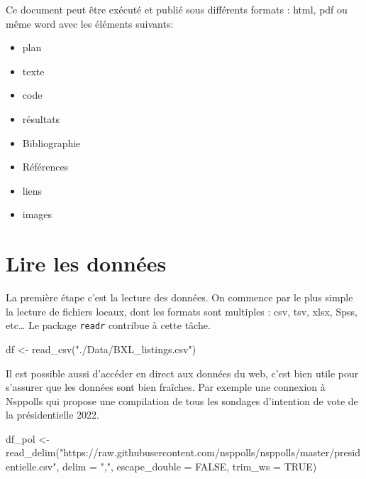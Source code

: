 \documentclass[
]{book}
\newenvironment{Shaded}{\begin{snugshade}}{\end{snugshade}}
\newcommand{\AttributeTok}[1]{\textcolor[rgb]{0.77,0.63,0.00}{#1}}
\newcommand{\ConstantTok}[1]{\textcolor[rgb]{0.00,0.00,0.00}{#1}}
\newcommand{\FunctionTok}[1]{\textcolor[rgb]{0.00,0.00,0.00}{#1}}
\newcommand{\NormalTok}[1]{#1}
\newcommand{\OtherTok}[1]{\textcolor[rgb]{0.56,0.35,0.01}{#1}}
\newcommand{\StringTok}[1]{\textcolor[rgb]{0.31,0.60,0.02}{#1}}
\providecommand{\tightlist}{%
  \setlength{\itemsep}{0pt}\setlength{\parskip}{0pt}}
\begin{document}
Ce document peut être exécuté et publié sous différents formats : html, pdf ou même word avec les éléments suivants:

\begin{itemize}
\tightlist
\item
  plan
\item
  texte
\item
  code
\item
  résultats
\item
  Bibliographie
\item
  Références
\item
  liens
\item
  images
\end{itemize}

\hypertarget{lire-les-donnuxe9es}{%
\section{Lire les données}\label{lire-les-donnuxe9es}}

La première étape c'est la lecture des données. On commence par le plus simple la lecture de fichiers locaux, dont les formats sont multiples : csv, tsv, xlsx, Spss, etc\ldots{} Le package \texttt{readr} contribue à cette tâche.

\begin{Shaded}
\begin{Highlighting}[]
\NormalTok{df }\OtherTok{\textless{}{-}} \FunctionTok{read\_csv}\NormalTok{(}\StringTok{"./Data/BXL\_listings.csv"}\NormalTok{)}
\end{Highlighting}
\end{Shaded}

Il est possible aussi d'accéder en direct aux données du web, c'est bien utile pour s'assurer que les données sont bien fraîches. Par exemple une connexion à Nsppolls qui propose une compilation de tous les sondages d'intention de vote de la présidentielle 2022.

\begin{Shaded}
\begin{Highlighting}[]
\NormalTok{df\_pol }\OtherTok{\textless{}{-}} \FunctionTok{read\_delim}\NormalTok{(}\StringTok{"https://raw.githubusercontent.com/nsppolls/nsppolls/master/presidentielle.csv"}\NormalTok{, }
                     \AttributeTok{delim =} \StringTok{","}\NormalTok{, }\AttributeTok{escape\_double =} \ConstantTok{FALSE}\NormalTok{, }\AttributeTok{trim\_ws =} \ConstantTok{TRUE}\NormalTok{)}
\end{Highlighting}
\end{Shaded}
\end{document}
